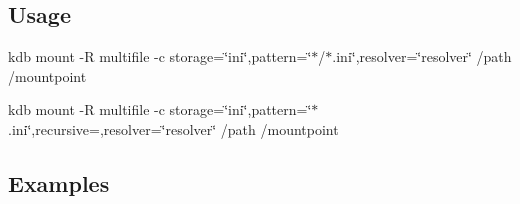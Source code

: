 \subsection*{Usage}

{\ttfamily kdb mount -\/R multifile -\/c storage=\char`\"{}ini\char`\"{},pattern=\char`\"{}$\ast$/$\ast$.\+ini\char`\"{},resolver=\char`\"{}resolver\char`\"{} /path /mountpoint}

{\ttfamily kdb mount -\/R multifile -\/c storage=\char`\"{}ini\char`\"{},pattern=\char`\"{}$\ast$.\+ini\char`\"{},recursive=,resolver=\char`\"{}resolver\char`\"{} /path /mountpoint}

\subsection*{Examples}



